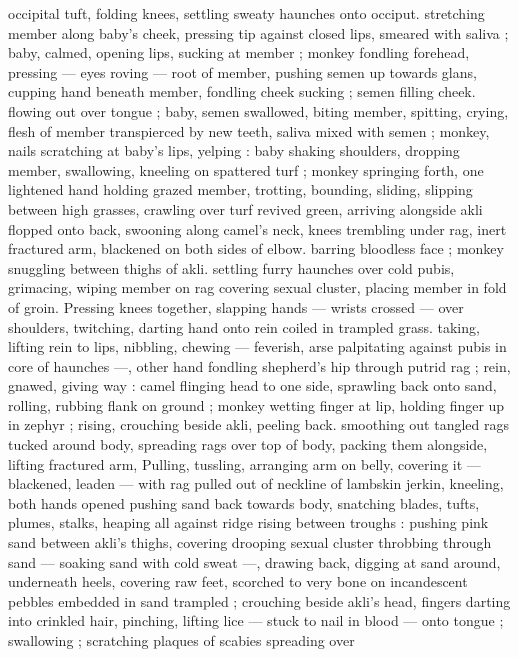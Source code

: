 occipital tuft, folding knees, settling sweaty haunches onto occiput. 
stretching member along baby's cheek, pressing tip against closed 
lips, smeared with saliva ; baby, calmed, opening lips, sucking at 
member ; monkey fondling forehead, pressing --- eyes roving --- 
root of member, pushing semen up towards glans, cupping hand 
beneath member, fondling cheek sucking ; semen filling cheek. 
flowing out over tongue ; baby, semen swallowed, biting member, 
spitting, crying, flesh of member transpierced by new teeth, saliva 
mixed with semen ; monkey, nails scratching at baby's lips, yelping : 
baby shaking shoulders, dropping member, swallowing, kneeling on 
spattered turf ; monkey springing forth, one lightened hand holding 
grazed member, trotting, bounding, sliding, slipping between high 
grasses, crawling over turf revived green, arriving alongside akli 
flopped onto back, swooning along camel's neck, knees trembling 
under rag, inert fractured arm, blackened on both sides of elbow. 
barring bloodless face ; monkey snuggling between thighs of akli. 
settling furry haunches over cold pubis, grimacing, wiping member 
on rag covering sexual cluster, placing member in fold of groin. 
Pressing knees together, slapping hands --- wrists crossed --- over 
shoulders, twitching, darting hand onto rein coiled in trampled grass. 
taking, lifting rein to lips, nibbling, chewing --- feverish, arse 
palpitating against pubis in core of haunches ---, other hand 
fondling shepherd's hip through putrid rag ; rein, gnawed, giving way 
: camel flinging head to one side, sprawling back onto sand, rolling, 
rubbing flank on ground ; monkey wetting finger at lip, holding finger 
up in zephyr ; rising, crouching beside akli, peeling back. smoothing 
out tangled rags tucked around body, spreading rags over top of 
body, packing them alongside, lifting fractured arm, Pulling, tussling, 
arranging arm on belly, covering it --- blackened, leaden --- with rag 
pulled out of neckline of lambskin jerkin, kneeling, both hands 
opened pushing sand back towards body, snatching blades, tufts, 
plumes, stalks, heaping all against ridge rising between troughs : 
pushing pink sand between akli's thighs, covering drooping sexual 
cluster throbbing through sand --- soaking sand with cold sweat ---, 
drawing back, digging at sand around, underneath heels, covering 
raw feet, scorched to very bone on incandescent pebbles embedded 
in sand trampled ; crouching beside akli's head, fingers darting into 
crinkled hair, pinching, lifting lice --- stuck to nail in blood --- onto 
tongue ; swallowing ; scratching plaques of scabies spreading over 
